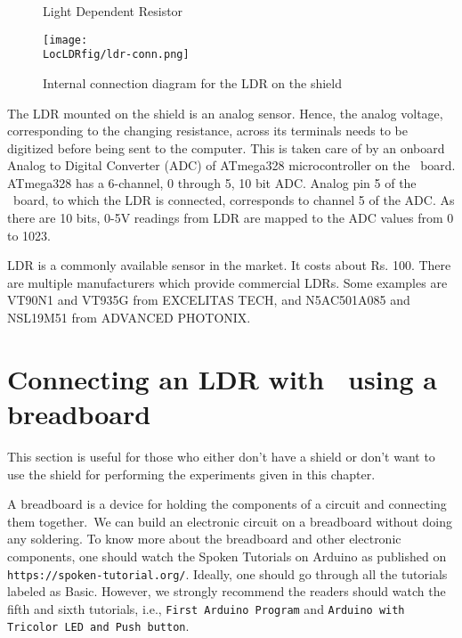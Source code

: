 \begin{figure}
  \centering
   \hfill
  \caption{Light Dependent Resistor}
\end{figure}

\begin{figure}
  \centering
  \texttt{[image: \\LocLDRfig/ldr-conn.png]}
  \caption{Internal connection diagram for the LDR on the shield}
  \label{fig:ldrconn}
\end{figure}

The LDR mounted on the shield is an analog sensor. Hence, the analog voltage, corresponding to the changing resistance, across its terminals needs to be digitized before being sent to the computer. This is taken care of by an onboard Analog to Digital Converter (ADC) of ATmega328 microcontroller on the \arduino\
board. ATmega328 has a 6-channel, 0 through 5, 10 bit ADC. Analog pin
5 of the \arduino\ board, to which the LDR is connected, corresponds
to channel 5 of the ADC.  As there are 10 bits, 0-5V readings from LDR
are mapped to the ADC values from 0 to 1023. 

LDR is a commonly available sensor in the market. It costs about
Rs. 100. There are multiple manufacturers which provide commercial
LDRs.  Some examples are VT90N1 and VT935G from EXCELITAS TECH, and
N5AC501A085 and NSL19M51 from ADVANCED PHOTONIX. 

\section{Connecting an LDR with \arduino\ using a breadboard}
This section is useful for those who either don't have a shield or don't want to use the shield
for performing the experiments given in this chapter. 

A breadboard is a device for holding the components of a circuit and connecting 
them together. We can build an electronic circuit on a breadboard without doing any 
soldering. To know more about the breadboard and other electronic components, 
one should watch the Spoken Tutorials on Arduino as published on
  {\tt https://spoken-tutorial.org/}. Ideally, one should go through all the
tutorials labeled as Basic. However, we strongly recommend the readers should
watch the fifth and sixth tutorials, i.e., {\tt First Arduino Program} and 
  {\tt Arduino with Tricolor LED and Push button}.

